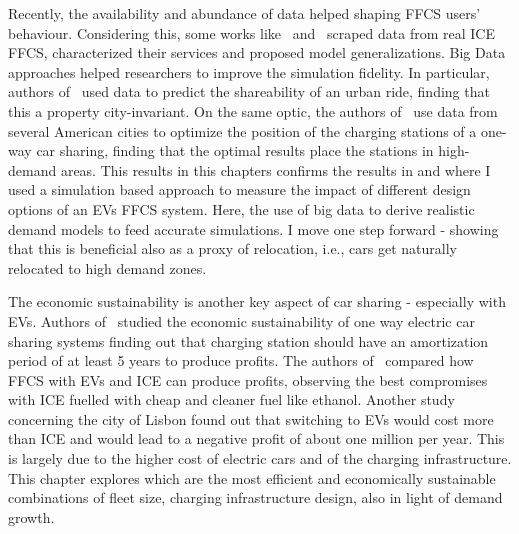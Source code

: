Recently, the availability and abundance of data helped shaping FFCS users' behaviour.  Considering this, some works like~\cite{9_habibi2017comparison} and~\cite{10_ciociola2017umap} scraped data from real ICE FFCS, characterized their services and proposed model generalizations. %
Big Data approaches helped researchers to improve the simulation fidelity. In particular, authors of~\cite{0_tachet2017scaling} used data to predict the shareability of an urban ride, finding that this a property city-invariant.  %
On the same optic, the authors of~\cite{22_li2016design} use data from several American cities to optimize the position of the charging stations of a one-way car sharing, finding that  the optimal  results place the stations in high-demand areas.  
This results in this chapters confirms the results in \cite{7_cocca2019free} and \cite{8_cocca2019free} where I used a simulation based approach to measure the impact of different design options of an EVs FFCS system. %
Here, the use of big data to derive realistic demand models to feed accurate simulations. I move one step forward - showing that this is beneficial also as a proxy of relocation, i.e., cars get naturally relocated to high demand zones.

The economic sustainability is another key aspect of car sharing - especially with EVs. Authors of~\cite{20_hua2019joint} studied the economic sustainability of one way electric car sharing systems finding out that charging station should have an amortization period of at least 5 years to produce profits.
The authors of~\cite{19_lemme2019optimization} compared how FFCS with EVs and ICE can produce profits, observing the best compromises with ICE fuelled with cheap and cleaner fuel like ethanol. 
Another study~\cite{21_vasconcelos2017financial} concerning the city of Lisbon found out that switching to EVs would cost more than ICE and would lead to a negative profit of about one million per year. This is largely due to the higher cost of electric cars and of the charging infrastructure.
This chapter explores which are the most efficient and economically sustainable combinations of fleet size, charging infrastructure design, also in light of demand growth.

